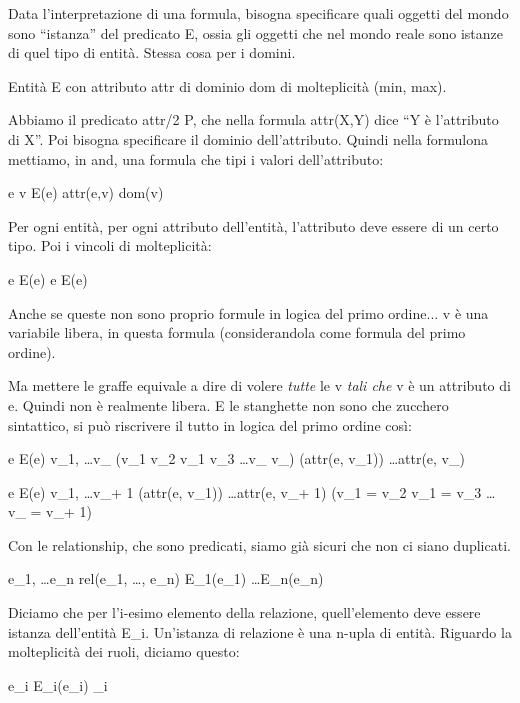 Data l'interpretazione di una formula, bisogna specificare quali oggetti del mondo sono ``istanza'' del predicato E, ossia gli oggetti che nel mondo reale sono istanze di quel tipo di entit\`a. Stessa cosa per i domini.

Entit\`a E con attributo attr di dominio dom di molteplicit\`a (min, max).

Abbiamo il predicato attr/2 \in P, che nella formula attr(X,Y) dice ``Y \`e l'attributo di X''. Poi bisogna specificare il dominio dell'attributo. Quindi nella formulona mettiamo, in and, una formula che tipi i valori dell'attributo:

\forall e \forall v E(e) \land attr(e,v) \implies dom(v)

Per ogni entit\`a, per ogni attributo dell'entit\`a, l'attributo deve essere di un certo tipo. Poi i vincoli di molteplicit\`a:

\forall e E(e) \implies {} \ge \min
\forall e E(e) \implies {} \le \max

Anche se queste non sono proprio formule in logica del primo ordine... v \`e una variabile libera, in questa formula (considerandola come formula del primo ordine).

Ma mettere le graffe equivale a dire di volere \emph{tutte} le v \emph{tali che} v \`e un attributo di e. Quindi non \`e realmente libera. E le stanghette non sono che zucchero sintattico, si pu\`o riscrivere il tutto in logica del primo ordine cos\`i:

\forall e E(e) \implies \exists v_1, \ldots v_{\min} 
(v_1 \neq v_2 \land v_1 \neq v_3 \lands \ldots \land v_{} \neq v_{\min}) \land
(attr(e, v_1)) \land \ldots \land attr(e, v_{\min})

\forall e E(e) \implies \forall v_1, \ldots v_{\max + 1} 
(attr(e, v_1)) \land \ldots \land attr(e, v_{\max + 1}) \implies
(v_1 = v_2 \lor v_1 = v_3 \lor \ldots \lor v_{\max} = v_{\max + 1}) \land

Con le relationship, che sono predicati, siamo gi\`a sicuri che non ci siano duplicati.

\forall e_1, \ldots e_n rel(e_1, \ldots, e_n) \implies E_1(e_1) \land \ldots \lands E_n(e_n)

Diciamo che per l'i-esimo elemento della relazione, quell'elemento deve essere istanza dell'entit\`a E_i. Un'istanza di relazione \`e una n-upla di entit\`a. Riguardo la molteplicit\`a dei ruoli, diciamo questo:

\forall e_i E_i(e_i) \implies {} \ge \min_i

